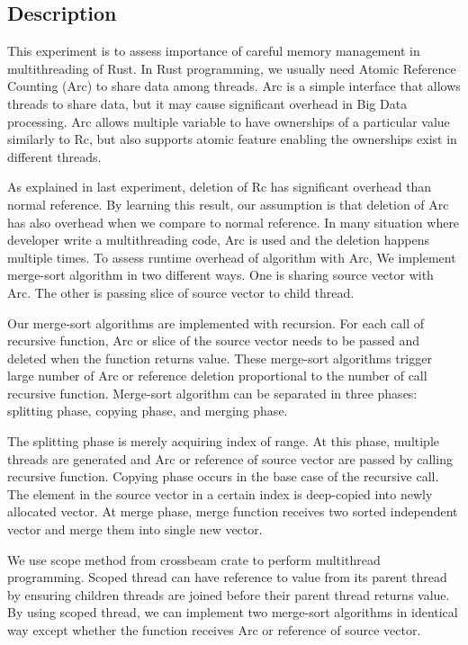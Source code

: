 \subsection{Description}
This experiment is to assess importance of careful memory management in multithreading of Rust. 
In Rust programming, we usually need Atomic Reference Counting (Arc) to share data among threads. 
Arc is a simple interface that allows threads to share data, but it may cause significant overhead in Big Data processing.
Arc allows multiple variable to have ownerships of a particular value similarly to Rc, 
but also supports atomic feature enabling the ownerships exist in different threads. 

As explained in last experiment, deletion of Rc has significant overhead than normal reference. 
By learning this result, our assumption is that deletion of Arc has also overhead when we compare to normal reference. 
In many situation where developer write a multithreading code, Arc is used and the deletion happens multiple times. 
To assess runtime overhead of algorithm with Arc, We implement merge-sort algorithm in two different ways. 
One is sharing source vector with Arc. The other is passing slice of source vector to child thread. 

Our merge-sort algorithms are implemented with recursion. For each call of recursive function, 
Arc or slice of the source vector needs to be passed and deleted when the function returns value. 
These merge-sort algorithms trigger large number of Arc or reference deletion proportional to the number of call recursive function.
Merge-sort algorithm can be separated in three phases: splitting phase, copying phase, and merging phase. 

The splitting phase is merely acquiring index of range. At this phase, multiple threads are generated and Arc or reference of source vector are passed by calling recursive function. 
Copying phase occurs in the base case of the recursive call. The element in the source vector in a certain index is deep-copied into newly allocated vector.
At merge phase, merge function receives two sorted independent vector and merge them into single new vector.

We use scope method from crossbeam crate to perform multithread programming. 
Scoped thread can have reference to value from its parent thread by ensuring children threads are joined before their parent thread returns value. 
By using scoped thread, we can implement two merge-sort algorithms in identical way except whether the function receives Arc or reference of source vector.



